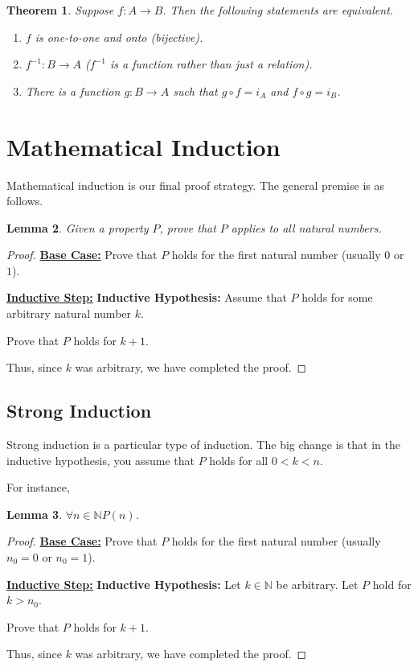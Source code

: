 \documentclass{article}
\newtheorem{theorem}{Theorem}[section]
\newtheorem{lemma}[theorem]{Lemma}
\begin{document}
\begin{theorem}
    Suppose $f : A \rightarrow B$. Then the following statements are equivalent. 
    \begin{enumerate}
        \item $f$ is one-to-one and onto (bijective).
        \item $f^{-1}: B \rightarrow A$ ($f^{-1}$ is a function rather than just a relation).
        \item There is a function $g : B \rightarrow A$ such that $g \circ f = i_A$ and 
        $f \circ g = i_B$.
    \end{enumerate}
\end{theorem}


\section{Mathematical Induction}
Mathematical induction is our final proof strategy. The general premise is as follows. \\

\begin{lemma}
    Given a property $P$, prove that $P$ applies to all natural numbers.
\end{lemma}
\begin{proof}
    \textbf{\underline{Base Case:}} Prove that $P$ holds for the first natural number (usually $0$ or $1$).

    \textbf{\underline{Inductive Step:}} 
    \textbf{Inductive Hypothesis:} Assume that $P$ holds for some arbitrary natural number $k$.
    
    Prove that $P$ holds for $k+1$.

    Thus, since $k$ was arbitrary, we have completed the proof.
\end{proof}


\subsection{Strong Induction}
Strong induction is a particular type of induction. The big change is that in the inductive hypothesis, you assume that $P$ holds for all $0 < k < n$. 

For instance,
\begin{lemma}
    $\forall n \in \mathbb{N}P(n)$.
\end{lemma}
\begin{proof}
    \textbf{\underline{Base Case:}} Prove that $P$ holds for the first natural number (usually $n_0 = 0$ or $n_0 = 1$).

    \textbf{\underline{Inductive Step:}} 
    \textbf{Inductive Hypothesis:} Let $k \in \mathbb{N}$ be arbitrary. Let $P$ hold for $k > n_0$.
    
    Prove that $P$ holds for $k+1$.

    Thus, since $k$ was arbitrary, we have completed the proof.
\end{proof}
\end{document}
